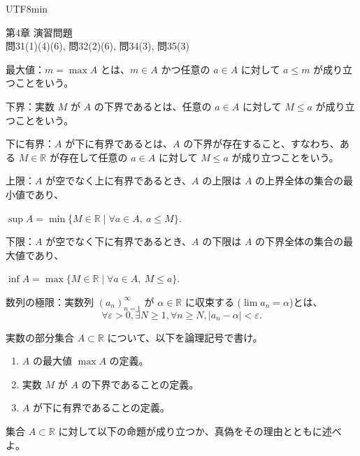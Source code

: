 \documentclass{article}
\newcommand{\mondai}[1]{%
  \par\medskip
  \noindent{\large #1}\quad\ignorespaces
}
\newcommand{\defitem}[1]{%
  \par\noindent #1\par
}
\begin{document}
\begin{CJK}{UTF8}{min}

\begin{center}
{\Large 第4章 演習問題}\\
問31(1)(4)(6), 問32(2)(6), 問34(3), 問35(3)
\end{center}


\defitem{最大値：$m=\max A$ とは、$m\in A$ かつ任意の $a\in A$ に対して $a\le m$ が成り立つことをいう。}


\defitem{下界：実数 $M$ が $A$ の下界であるとは、任意の $a\in A$ に対して $M\le a$ が成り立つことをいう。}


\defitem{下に有界：$A$ が下に有界であるとは、$A$ の下界が存在すること、すなわち、ある $M\in\mathbb{R}$ が存在して任意の $a\in A$ に対して $M\le a$ が成り立つことをいう。}

\defitem{上限：$A$ が空でなく上に有界であるとき、$A$ の上限は $A$ の上界全体の集合の最小値であり、}
\begin{center}
$\displaystyle \sup A=\min\{M\in\mathbb{R}\mid \forall a\in A,\ a\le M\}$.
\end{center}


\defitem{下限：$A$ が空でなく下に有界であるとき、$A$ の下限は $A$ の下界全体の集合の最大値であり、}
\begin{center}
$\displaystyle \inf A=\max\{M\in\mathbb{R}\mid \forall a\in A,\ M\le a\}$.
\end{center}

\defitem{数列の極限：実数列 $(a_n)_{n=1}^{\infty}$ が $\alpha\in\mathbb{R}$ に収束する ($\lim a_n=\alpha$)とは、
$$\forall \varepsilon>0, \exists N\ge 1, \forall n\ge N, |a_n-\alpha|<\varepsilon.$$}



\mondai{問題31}実数の部分集合 $A\subset \mathbb{R}$ について、以下を論理記号で書け。

\begin{enumerate}
\setcounter{enumi}{0}
\item $A$ の最大値 $\max A$ の定義。
\setcounter{enumi}{3}
\item 実数 $M$ が $A$ の下界であることの定義。
\setcounter{enumi}{5}
\item $A$ が下に有界であることの定義。
\end{enumerate}

\mondai{問題32}集合 $A\subset \mathbb{R}$ に対して以下の命題が成り立つか、真偽をその理由とともに述べよ。


\end{CJK}
\end{document}
